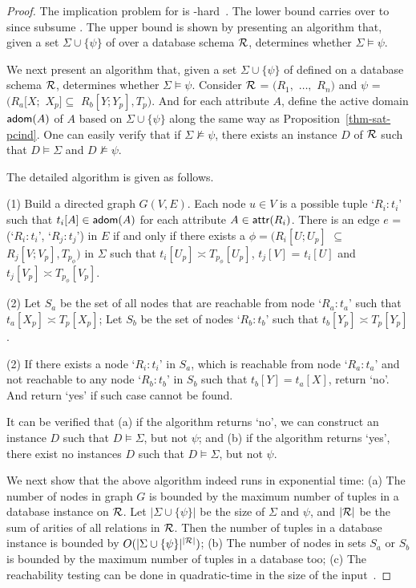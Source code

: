 \begin{proof}
The implication problem for \CINDs is
\EXPTIME-hard~\cite{tcs-CINDs}. The lower bound carries over to \pCINDs
since \pCINDs subsume \CINDs. The \EXPTIME upper bound is shown
by presenting an \EXPTIME algorithm that, given a set
$\Sigma\cup\{\psi\}$ of \pCINDs over a database schema $\cal R$,
determines whether $\Sigma\models\psi$.

We next present an \EXPTIME algorithm that, given a set
$\Sigma\cup\{\psi\}$ of \pCINDs defined on a database schema $\cal
R$, determines whether $\Sigma\models\psi$.
%
Consider $\cal R$ = $(R_1,$ $\ldots,$ $R_n)$ and $\psi$ = $(R_a[X;$ $X_p]
\subseteq$ $R_b[Y;Y_p], T_p)$. And for each attribute $A$,
define the active domain ${\mathsf{adom}}(A)$ of $A$ based on
$\Sigma\cup\{\psi\}$ along the same way as
Proposition~\ref{thm-sat-pcind}. One can easily verify that if
$\Sigma\not\models\psi$, there exists an instance $D$ of ${\cal
R}$ such that $D\models\Sigma$ and $D\not\models\psi$.

The detailed \EXPTIME algorithm is given as follows.

\bi
\item[(1)]
Build a directed graph $G(V, E)$.  Each node $u\in V$ is a possible
tuple `$R_i:t_i$' such that $t_i[A]\in {\ensuremath {\mathsf{adom}}}(A)$ for each attribute
$A\in\protect\mathsf{attr}(R_i)$. There is an edge $e$ = (`$R_i:t_i$',
`$R_j:t_j$') in $E$ if and only if there exists a \pCIND $\phi =
(R_i[U; U_p]$ $\subseteq$ $ R_j[V; V_p], T_{p_{\phi}})$ in $\Sigma$
such that $t_i[U_p] \asymp T_{p_{\phi}}[U_p]$, $t_j[V]$ = $t_i[U]$
and $t_j[V_p] \asymp T_{p_{\phi}}[V_p]$.

\item[(2)]
Let $S_a$ be the set of all nodes that are reachable from node
`$R_a:t_a$' such that $t_a[X_p] \asymp T_{p}[X_p]$;
 Let $S_b$ be the
set of nodes `$R_b:t_b$' such that $t_b[Y_p] \asymp T_{p}[Y_p]$.

\item[(2)]
If there exists a node `$R_i:t_i$' in $S_a$, which is reachable from
node `$R_a:t_a$' and not reachable to any node `$R_b:t_b$' in $S_b$
such that $t_b[Y] = t_a[X]$, return `no'. And return `yes' if such
case cannot be found. \ei


It can be verified that (a) if the algorithm returns `no', we can
construct an instance $D$ such that $D\models\Sigma$, but not
$\psi$; and (b) if the algorithm returns `yes', there exist no
instances $D$ such that $D\models\Sigma$, but not $\psi$.

We next show that the above algorithm indeed runs in exponential
time: (a) The number of nodes in graph $G$ is bounded by the maximum
number of tuples in a database instance on $\R$. Let
$|\Sigma\cup\{\psi\}|$ be the size of $\Sigma$ and $\psi$, and
$|\cal R|$ be the sum of arities of all relations in $\cal R$. Then
the number of tuples in a database instance is bounded by
$O(|\Sigma\cup\{\psi\}|^{|\cal
 R|})$; (b) The number of nodes in sets $S_a$ or $S_b$ is bounded by
the maximum number of tuples in a database too; (c) The reachability
testing can be done in quadratic-time in the size of the
input~\cite{Papa1994}.


\end{proof}
